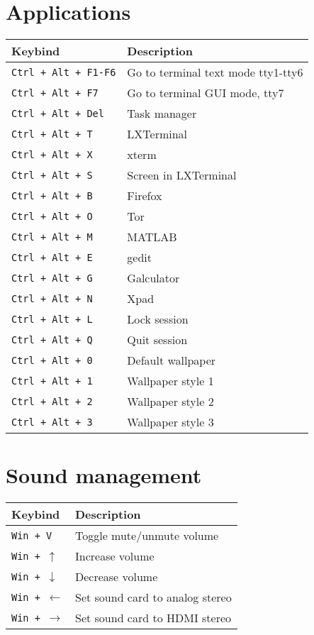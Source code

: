 \documentclass[letterpaper,12pt]{article}
\begin{document}
\section*{Applications}
\begin{table}[H]
  \begin{tabular}{|C{5cm}|L{10cm}|}
    \hline
    \textbf{Keybind} & \textbf{Description} \\
    \hline
    {\tt Ctrl + Alt + F1-F6} & Go to terminal text mode tty1-tty6 \\
    {\tt Ctrl + Alt + F7} & Go to terminal GUI mode, tty7 \\
    {\tt Ctrl + Alt + Del} & Task manager \\
    {\tt Ctrl + Alt + T} & LXTerminal \\
    {\tt Ctrl + Alt + X} & xterm \\
    {\tt Ctrl + Alt + S} & Screen in LXTerminal \\
    {\tt Ctrl + Alt + B} & Firefox \\
    {\tt Ctrl + Alt + O} & Tor \\
    {\tt Ctrl + Alt + M} & MATLAB \\
    {\tt Ctrl + Alt + E} & gedit \\
    {\tt Ctrl + Alt + G} & Galculator \\
    {\tt Ctrl + Alt + N} & Xpad \\
    {\tt Ctrl + Alt + L} & Lock session \\
    {\tt Ctrl + Alt + Q} & Quit session \\
    {\tt Ctrl + Alt + 0} & Default wallpaper \\
    {\tt Ctrl + Alt + 1} & Wallpaper style 1 \\
    {\tt Ctrl + Alt + 2} & Wallpaper style 2 \\
    {\tt Ctrl + Alt + 3} & Wallpaper style 3 \\
    \hline
  \end{tabular}
\end{table}

\section*{Sound management}
\begin{table}[H]
  \begin{tabular}{|C{5cm}|L{10cm}|}
    \hline
    \textbf{Keybind} & \textbf{Description} \\
    \hline
    {\tt Win + V} & Toggle mute/unmute volume \\ 
    {\tt Win + $\uparrow$} & Increase volume \\ 
    {\tt Win + $\downarrow$} & Decrease volume \\ 
    {\tt Win + $\leftarrow$} & Set sound card to analog stereo \\ 
    {\tt Win + $\rightarrow$} & Set sound card to HDMI stereo \\ 
    \hline
  \end{tabular}
\end{table}
\end{document}
